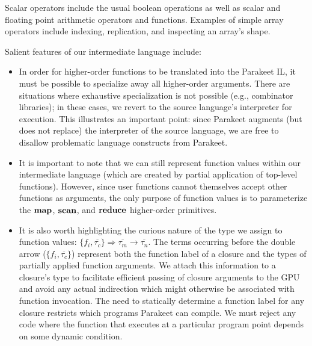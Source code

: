 \documentclass[preprint]{sigplanconf}
\begin{document}
Scalar operators include the usual boolean operations as well as scalar and
floating point arithmetic operators and functions. Examples of simple array
operators include indexing, replication, and inspecting an array's shape.

Salient features of our intermediate language include:
\begin{itemize}
\item In order for higher-order functions to be translated into the Parakeet IL,
it must be possible to specialize away all higher-order arguments. There
are situations where exhaustive specialization is not possible (e.g., combinator
libraries); in these cases, we revert to the source language's interpreter for
execution. This illustrates an important point: since Parakeet augments (but
does not replace) the interpreter of the source language, we are free to
disallow problematic language constructs from Parakeet.

\item It is important to note that we can still represent function values
within our intermediate language (which are created by partial application of
top-level functions). However, since user functions cannot themselves accept
other functions as arguments, the only purpose of function values is to
parameterize the $\mbox{\textbf{map}}$, $\mbox{\textbf{scan}}$, and $\mbox{\textbf{reduce}}$ higher-order primitives.

\item It is also worth highlighting the curious nature of the type we assign to
function values:
$ \{ f_i, \overline{\tau_{c}} \} \Rightarrow \overline{\tau_m} \rightarrow
\overline{\tau_n}$.  The terms occurring before the double arrow ($\{f_i,
\overline{\tau_{c}} \}$) represent both the function label of a closure and the
types of partially applied function arguments. We attach this information to a
closure's type to facilitate efficient passing of closure arguments to the GPU
and avoid any actual indirection which might otherwise be associated with
function invocation. The need to statically determine a function label for any
closure restricts which programs Parakeet can compile. We
must reject any code where the function
that executes at a particular
program point depends on some dynamic condition.
\end{itemize}
\end{document}
